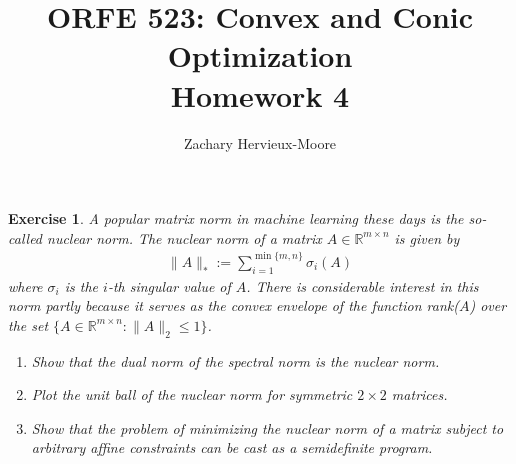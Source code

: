 \documentclass[12pt]{article}
\title{ORFE 523: Convex and Conic Optimization \\ Homework 4}
\author{Zachary Hervieux-Moore}
\date{\displaydate{date}}
\theoremstyle{colon}
\newtheorem{exercise}{Exercise}
\begin{document}
\maketitle

\clearpage

\begin{exercise}
  A popular matrix norm in machine learning these days is the so-called \textit{nuclear norm}. The nuclear norm of a matrix $A \in \mathbb{R}^{m \times n}$ is given by
  \begin{gather*}
    \lVert A \rVert_* := \sum_{i=1}^{\min \{m,n\}} \sigma_i(A)
  \end{gather*}
  where $\sigma_i$ is the $i$-th singular value of $A$. There is considerable interest in this norm partly because it serves as the convex envelope of the function rank($A$) over the set $\{ A \in \mathbb{R}^{m \times n} : \lVert A \rVert_2 \leq 1 \}$.
  \begin{enumerate}[label=\arabic*)]
    \item Show that the dual norm of the spectral norm is the nuclear norm.
    \item Plot the unit ball of the nuclear norm for symmetric $2 \times 2$ matrices.
    \item Show that the problem of minimizing the nuclear norm of a matrix subject to arbitrary affine constraints can be cast as a semidefinite program.
  \end{enumerate}
\end{exercise}
\end{document}
